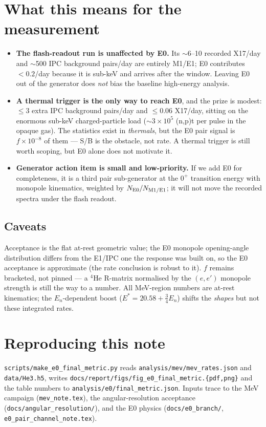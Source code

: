 \documentclass[11pt,a4paper]{article}
\newcommand{\He}[1]{$^{#1}$He}
\newcommand{\En}{E_n}
\begin{document}
\section{What this means for the measurement}

\begin{itemize}\setlength\itemsep{2pt}
  \item \textbf{The flash-readout run is unaffected by E0.} Its $\sim$6--10
    recorded X17/day and $\sim$500 IPC background pairs/day are entirely M1/E1;
    E0 contributes $<0.2$/day because it is sub-keV and arrives after the
    window. Leaving E0 out of the generator does \emph{not} bias the baseline
    high-energy analysis.
  \item \textbf{A thermal trigger is the only way to reach E0}, and the prize is
    modest: $\le3$ extra IPC background pairs/day and $\le0.06$ X17/day, sitting
    on the enormous sub-keV charged-particle load ($\sim3\times10^{5}$ (n,p)t
    per pulse in the opaque gas). The statistics exist in \emph{thermals}, but
    the E0 pair signal is $f\times10^{-8}$ of them --- S/B is the obstacle, not
    rate. A thermal trigger is still worth scoping, but E0 alone does not
    motivate it.
  \item \textbf{Generator action item is small and low-priority.} If we add E0
    for completeness, it is a third pair sub-generator at the $0^+$ transition
    energy with monopole kinematics, weighted by $N_{\rm E0}/N_{\rm M1/E1}$; it
    will not move the recorded spectra under the flash readout.
\end{itemize}

\subsection*{Caveats}
Acceptance is the flat at-rest geometric value; the E0 monopole opening-angle
distribution differs from the E1/IPC one the response was built on, so the E0
acceptance is approximate (the rate conclusion is robust to it). $f$ remains
bracketed, not pinned --- a \He{4} R-matrix normalised by the $(e,e')$ monopole
strength is still the way to a number. All MeV-region numbers are at-rest
kinematics; the $\En$-dependent boost ($E^*=20.58+\tfrac34\En$) shifts the
\emph{shapes} but not these integrated rates.

\section*{Reproducing this note}
{\raggedright
\texttt{scripts/make\_e0\_final\_metric.py} reads
\texttt{analysis/mev/mev\_rates.json} and \texttt{data/He3.h5}, writes
\texttt{docs/report/figs/fig\_e0\_final\_metric.\{pdf,png\}} and the table
numbers to \texttt{analysis/e0/final\_metric.json}. Inputs trace to the MeV
campaign (\texttt{mev\_note.tex}), the angular-resolution acceptance
(\texttt{docs/angular\_resolution/}), and the E0 physics
(\texttt{docs/e0\_branch/}, \texttt{e0\_pair\_channel\_note.tex}).
\par}
\end{document}
